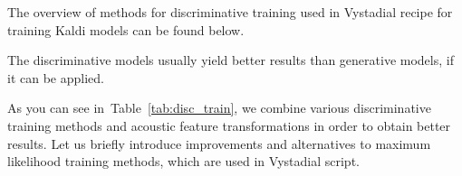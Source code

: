 The overview of methods for discriminative training used in Vystadial recipe for training Kaldi models
can be found below.

The discriminative models usually yield better results than generative models, if it can be applied. 


As you can see in~Table~\ref{tab:disc_train}, we combine various discriminative training methods
and acoustic feature transformations in order to obtain better results. 
Let us briefly introduce improvements and alternatives to maximum likelihood training methods,
which are used in Vystadial script.

